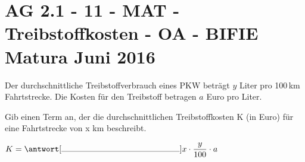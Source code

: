 \section{AG 2.1 - 11 - MAT - Treibstoffkosten - OA - BIFIE Matura Juni 2016}

\begin{beispiel}[AG 2.1]{1} %
Der durchschnittliche Treibstoffverbrauch eines PKW beträgt $y$ Liter pro 100\,km Fahrtstrecke.
Die Kosten für den Treibstoff betragen $a$ Euro pro Liter.

Gib einen Term an, der die durchschnittlichen Treibstoffkosten K (in Euro) für eine Fahrtstrecke
von x km beschreibt. \leer

$K=\antwort[\rule{5cm}{0.3pt}]{x\cdot \dfrac{y}{100} \cdot a}$
\end{beispiel}